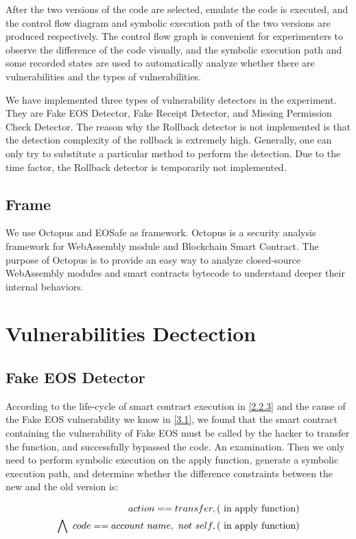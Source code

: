 \documentclass[a4paper, 10pt, conference, twocolumn]{ieeeconf}       %
\begin{document}
After the two versions of the code are selected,
emulate the code is executed,
and the control flow diagram and symbolic execution path of the two versions are produced respectively.
The control flow graph is convenient for experimenters to observe the difference of the code visually,
and the symbolic execution path and some recorded states are used to automatically analyze whether there are vulnerabilities and the types of vulnerabilities.

We have implemented three types of vulnerability detectors in the experiment.
They are Fake EOS Detector, Fake Receipt Detector,
and Missing Permission Check Detector.
The reason why the Rollback detector is not implemented is that the detection complexity of the rollback is extremely high.
Generally, one can only try to substitute a particular method to perform the detection.
Due to the time factor,
the Rollback detector is temporarily not implemented.

\subsection{Frame}
We use Octopus and EOSafe as framework.
Octopus is a security analysis framework for WebAssembly module and Blockchain Smart Contract.
The purpose of Octopus is to provide an easy way to analyze closed-source WebAssembly modules and smart contracts bytecode to understand deeper their internal behaviors.


\section{Vulnerabilities Dectection}


\subsection{Fake EOS Detector}
According to the life-cycle of smart contract execution in \ref{2.2.3} and the cause of the Fake EOS vulnerability we know in \ref{3.1},
we found that the smart contract containing the vulnerability of Fake EOS must be called by the hacker to transfer the function,
and successfully bypassed the code. An examination.
Then we only need to perform symbolic execution on the apply function,
generate a symbolic execution path,
and determine whether the difference constraints between the new and the old version is:

\begin{equation}
\begin{aligned}
action == transfer,(\rm~in~apply~function) \\ \bigwedge~code == account~name,~not~self,(\rm~in~apply~function) 
\end{aligned}
\end{equation}
\end{document}
